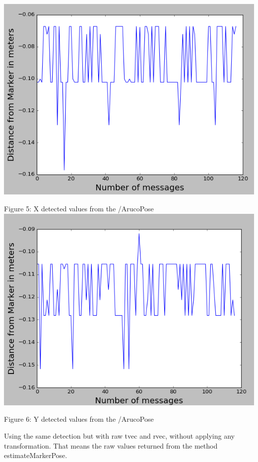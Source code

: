 \documentclass{article}
\begin{document}
\begin{center}
    \includegraphics[scale=0.5]{pic8.png}
    
    Figure 5: X detected values from the /ArucoPose
    \includegraphics[scale=0.5]{pic9.png}
    
    Figure 6: Y detected values from the /ArucoPose
\end{center}

Using the same detection but with raw tvec and rvec, without applying any transformation. That means the raw values returned from the method estimateMarkerPose.
\end{document}
